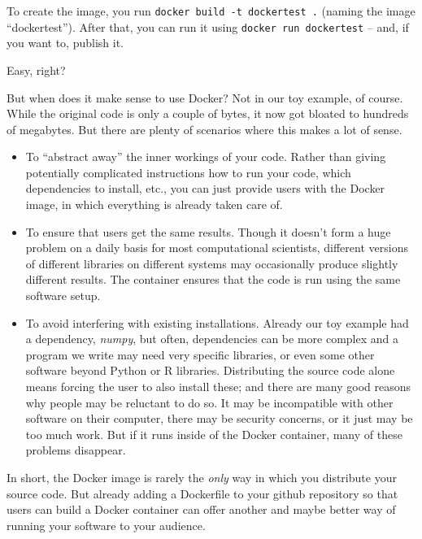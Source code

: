 To create the image, you run \verb|docker build -t dockertest .| (naming
the image ``dockertest''). After that, you can run
it using \verb|docker run dockertest| -- and, if you want to, publish it.

Easy, right?

But when does it make sense to use Docker? Not in our toy example,
of course. While the original code is only a couple of bytes, it now
got bloated to hundreds of megabytes. But there are plenty of
scenarios where this makes a lot of sense.

\begin{itemize}
\item To ``abstract away'' the inner workings of your code. Rather than giving potentially complicated instructions how to run your code, which dependencies to install, etc., you can just provide users with the Docker image, in which everything is already taken care of.
\item To ensure that users get the same results. Though it doesn't form a huge problem on a daily basis for most computational scientists, different versions of different libraries on different systems may occasionally produce slightly different results. The container ensures that the code is run using the same software setup.
\item To avoid interfering with existing installations. Already our toy example had a dependency, \emph{numpy}, but often, dependencies can be more complex and a program we write may need very specific libraries, or even some other software beyond Python or R libraries. Distributing the source code alone means forcing the user to also install these; and there are many good reasons why people may be reluctant to do so. It may be incompatible with other software on their computer, there may be security concerns, or it just may be too much work. But if it runs inside of the Docker container, many of these problems disappear.
\end{itemize}

In short, the Docker image is rarely the \emph{only} way in which you distribute your source code. But already adding a Dockerfile to your github repository so that users can build a Docker container can offer another and maybe better way of running your software to your audience.

